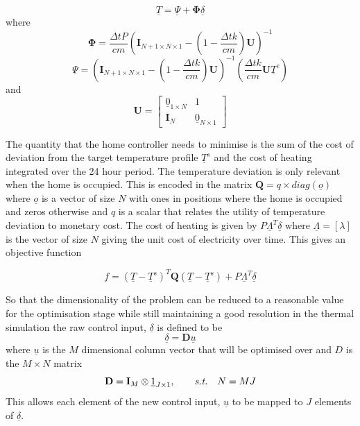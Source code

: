 \documentclass[a4paper, 10 pt, conference]{ieeeconf}  %
\begin{document}
\begin{equation}
\underline{T}=\underline{\Psi}+\boldsymbol{\Phi} \underline{\delta}
\end{equation}
where
\begin{equation}
\boldsymbol{\Phi}= \frac{\Delta t P}{cm} \left( \mathbf{I}_{N+1 \times N \times 1}-(1-\frac{\Delta t k}{cm})\mathbf{U}\right)^{-1}
\end{equation}
\begin{equation}
\underline{\Psi}= \left( \mathbf{I}_{N+1 \times N \times 1}-(1-\frac{\Delta t k}{cm})\mathbf{U}\right)^{-1} \left( \frac{\Delta t k}{cm}\mathbf{U}\underline{T}^{e}\right)
\end{equation}
and
\begin{equation}
\mathbf{U} = \left[
\begin{array}{c|c}
\underline{0}_{1\times N} & 1 \\ \hline
\mathbf{I}_{N} & \underline{0}_{N \times 1}
\end{array}\right]
\end{equation}

The quantity that the home controller needs to minimise is the sum of the cost of deviation from the target temperature profile $\underline{T}^s$ and the cost of heating integrated over the 24 hour period. The temperature deviation is only relevant when the home is occupied. This is encoded in the matrix $\mathbf{Q}=q \times diag(\underline{o})$ where $\underline{o}$ is a vector of size $N$ with ones in positions where the home is occupied and zeros otherwise and $q$ is a scalar that relates the utility of temperature deviation to monetary cost. The cost of heating is given by $P\underline{\Lambda}^{T} \underline{\delta}$ where $\underline{\Lambda}=[ \lambda ]$ is the vector of size $N$ giving the unit cost of electricity over time. This gives an objective function

\begin{equation}
f = (\underline{T}-\underline{T}^s)^{T}\mathbf{Q}(\underline{T}-\underline{T}^s)+P\underline{\Lambda}^{T} \underline{\delta}
\end{equation}

So that the dimensionality of the problem can be reduced to a reasonable value for the optimisation stage while still maintaining a good resolution in the thermal simulation the raw control input, $\underline{\delta}$ is defined to be
\begin{equation}
\underline{\delta}=\mathbf{D}\underline{u}
\end{equation}
where $\underline{u}$ is the $M$ dimensional column vector that will be optimised over and $D$ is the $M\times N$ matrix
\begin{equation}
\label{quadthermodimension}
\mathbf{D}=\mathbf{I}_{M} \otimes \underline{1}_{J \times 1},\qquad \emph{s.t.} \quad N=MJ
\end{equation}
This allows each element of the new control input, $\underline{u}$ to be mapped to $J$ elements of $\underline{\delta}$.
\end{document}
